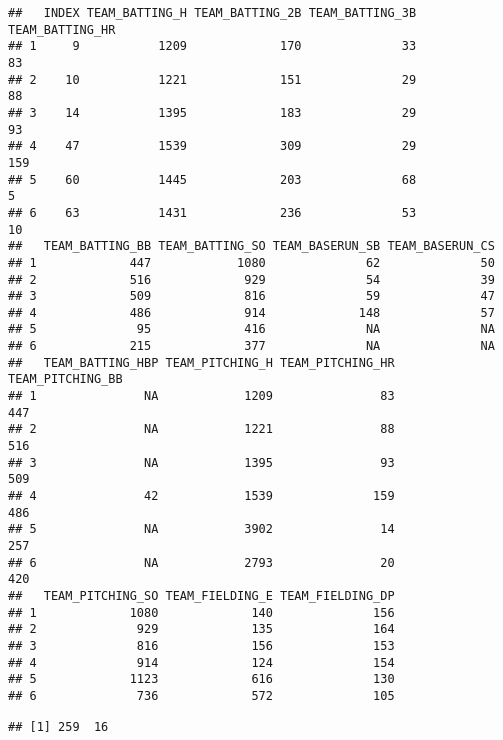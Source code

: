 \documentclass[
]{article}
\newenvironment{Shaded}{\begin{snugshade}}{\end{snugshade}}
\newcommand{\CommentTok}[1]{\textcolor[rgb]{0.56,0.35,0.01}{\textit{#1}}}
\newcommand{\KeywordTok}[1]{\textcolor[rgb]{0.13,0.29,0.53}{\textbf{#1}}}
\newcommand{\NormalTok}[1]{#1}
\newcommand{\OperatorTok}[1]{\textcolor[rgb]{0.81,0.36,0.00}{\textbf{#1}}}
\newcommand{\StringTok}[1]{\textcolor[rgb]{0.31,0.60,0.02}{#1}}
\begin{document}
\begin{verbatim}
##   INDEX TEAM_BATTING_H TEAM_BATTING_2B TEAM_BATTING_3B TEAM_BATTING_HR
## 1     9           1209             170              33              83
## 2    10           1221             151              29              88
## 3    14           1395             183              29              93
## 4    47           1539             309              29             159
## 5    60           1445             203              68               5
## 6    63           1431             236              53              10
##   TEAM_BATTING_BB TEAM_BATTING_SO TEAM_BASERUN_SB TEAM_BASERUN_CS
## 1             447            1080              62              50
## 2             516             929              54              39
## 3             509             816              59              47
## 4             486             914             148              57
## 5              95             416              NA              NA
## 6             215             377              NA              NA
##   TEAM_BATTING_HBP TEAM_PITCHING_H TEAM_PITCHING_HR TEAM_PITCHING_BB
## 1               NA            1209               83              447
## 2               NA            1221               88              516
## 3               NA            1395               93              509
## 4               42            1539              159              486
## 5               NA            3902               14              257
## 6               NA            2793               20              420
##   TEAM_PITCHING_SO TEAM_FIELDING_E TEAM_FIELDING_DP
## 1             1080             140              156
## 2              929             135              164
## 3              816             156              153
## 4              914             124              154
## 5             1123             616              130
## 6              736             572              105
\end{verbatim}

\begin{verbatim}
## [1] 259  16
\end{verbatim}

\begin{Shaded}
\end{Shaded}
\end{document}
